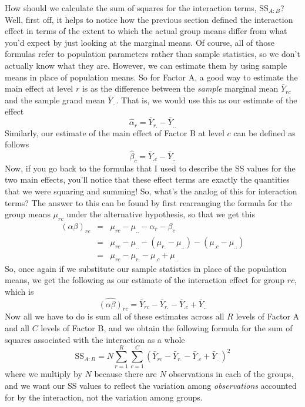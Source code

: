 \begin{mdframed}[style=MyFrame,nobreak=false]

How should we calculate the sum of squares for the interaction terms, SS$_{A:B}$? Well, first off, it helps to notice how the previous section defined the interaction effect in terms of the extent to which the actual group means differ from what you'd expect by just looking at the marginal means. Of course, all of those formulas refer to population parameters rather than sample statistics, so we don't actually know what they are. However, we can estimate them by using sample means in place of population means. So for Factor A, a good way to estimate the main effect at level $r$ is as the difference between the {\it sample} marginal mean $\bar{Y}_{rc}$ and the sample grand mean $\bar{Y}_{..}$. That is, we would use this as our estimate of the effect
$$
\hat{\alpha}_r = \bar{Y}_{r.} - \bar{Y}_{..}
$$
Similarly, our estimate of the main effect of Factor B at level $c$ can be defined as follows
$$
\hat{\beta}_c = \bar{Y}_{.c} - \bar{Y}_{..}
$$
Now, if you go back to the formulas that I used to describe the SS values for the two main effects, you'll notice that these effect terms are exactly the quantities that we were squaring and summing! So, what's the analog of this for interaction terms? The answer to this can be found by first rearranging the formula for the group means $\mu_{rc}$ under the alternative hypothesis, so that we get this
\begin{eqnarray*} 
(\alpha \beta)_{rc} &=& \mu_{rc} - \mu_{..} - \alpha_r - \beta_c \\
&=& \mu_{rc} - \mu_{..} - (\mu_{r.} - \mu_{..}) - (\mu_{.c} - \mu_{..}) \\
&=& \mu_{rc} - \mu_{r.} - \mu_{.c} + \mu_{..}
\end{eqnarray*}
So, once again if we substitute our sample statistics in place of the population means, we get the following as our estimate of the interaction effect for group $rc$, which is
$$
\hat{(\alpha\beta)}_{rc} = \bar{Y}_{rc} - \bar{Y}_{r.} - \bar{Y}_{.c} + \bar{Y}_{..}
$$
Now all we have to do is sum all of these estimates across all $R$ levels of Factor A and all $C$ levels of Factor B, and we obtain the following formula for the sum of squares associated with the interaction as a whole
$$
\mbox{SS}_{A:B} = N \sum_{r=1}^R \sum_{c=1}^C \left( \bar{Y}_{rc} - \bar{Y}_{r.} - \bar{Y}_{.c} + \bar{Y}_{..} \right)^2
$$
where we multiply by $N$ because there are $N$ observations in each of the groups, and we want our SS values to reflect the variation among {\it observations} accounted for by the interaction, not the variation among groups. 


\end{mdframed}
